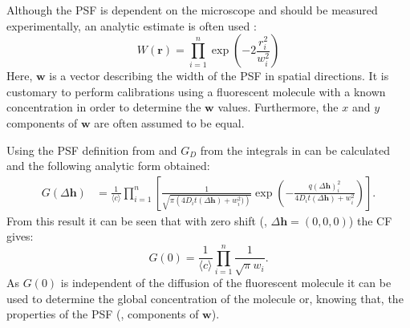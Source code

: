 Although the \ac{PSF} is dependent on the microscope and should be measured
experimentally, an analytic estimate is often used
\citep{Thompson2002,Lakowicz_06_Springer}:
\begin{equation}
  W(\mathbf{r}) = \prod_{i=1}^n\exp \left(
  -2\frac{r_i^2}{w_i^2}\right)
  \label{eq:PSF_def}
\end{equation}
Here, $\mathbf{w}$ is a vector describing the width of the \ac{PSF} in
spatial directions. It is customary to perform calibrations using a
fluorescent molecule with a known concentration in order to
determine the $\mathbf{w}$ values. Furthermore, the $x$ and $y$ 
components of $\mathbf{w}$ are often assumed to be equal.

Using the \ac{PSF} definition from \Eq{~\ref{eq:PSF_def}} and $G_D$ from
\Eq{~\ref{eq:g_d}} the integrals in \Eq{~\ref{eq:G_def}} can be calculated and 
the following analytic form obtained:
\begin{align}
  G(\Delta \mathbf{h}) &= \frac{1}{\langle c \rangle} 
  \prod_{i=1}^n\left[
  \frac{1}{\sqrt{\pi\left(4D_it(\Delta \mathbf{h})+w_i^2)\right)}}
  \exp\left(-\frac{q(\Delta \mathbf{h})_i^2}{4D_it(\Delta \mathbf{h})+w_i^2}\right)\right].
  \label{eq:G_0angle}
\end{align}
From this result it can be seen that with zero shift (\ie, 
$\Delta \mathbf{h} = (0,0,0)$) the \ac{CF} gives:
\begin{equation}
  G(0) = \frac{1}{\langle c
  \rangle}\prod_{i=1}^n\frac{1}{\sqrt{\pi}w_i}.
  \label{eq:G_0}
\end{equation}
As $G(0)$ is independent of the diffusion of the fluorescent
molecule it can be used to determine the global concentration of the
molecule or, knowing that, the properties of the \ac{PSF} (\ie, components
of $\mathbf{w}$).






